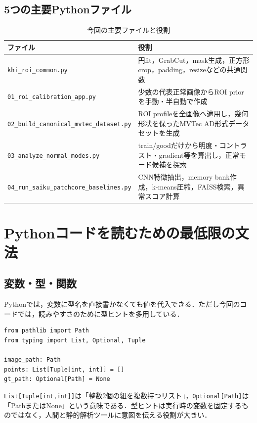 \documentclass[a4paper,11pt]{ltjsreport}
\begin{document}
\section{5つの主要Pythonファイル}
\begin{table}[H]
\centering
\caption{今回の主要ファイルと役割}
\begin{tabularx}{\linewidth}{L{44mm} Y}
\toprule
ファイル & 役割 \\
\midrule
\texttt{khi\_roi\_common.py} & 円fit，GrabCut，mask生成，正方形crop，padding，resizeなどの共通関数 \\
\texttt{01\_roi\_calibration\_app.py} & 少数の代表正常画像からROI priorを手動・半自動で作成 \\
\texttt{02\_build\_canonical\_mvtec\_dataset.py} & ROI profileを全画像へ適用し，幾何形状を保ったMVTec AD形式データセットを生成 \\
\texttt{03\_analyze\_normal\_modes.py} & train/goodだけから明度・コントラスト・gradient等を算出し，正常モード候補を探索 \\
\texttt{04\_run\_saiku\_patchcore\_baselines.py} & CNN特徴抽出，memory bank作成，k-means圧縮，FAISS検索，異常スコア計算 \\
\bottomrule
\end{tabularx}
\end{table}

\chapter{Pythonコードを読むための最低限の文法}

\section{変数・型・関数}
Pythonでは，変数に型名を直接書かなくても値を代入できる．ただし今回のコードでは，読みやすさのために型ヒントを多用している．

\begin{lstlisting}
from pathlib import Path
from typing import List, Optional, Tuple

image_path: Path
points: List[Tuple[int, int]] = []
gt_path: Optional[Path] = None
\end{lstlisting}

\texttt{List[Tuple[int,int]]}は「整数2個の組を複数持つリスト」，\texttt{Optional[Path]}は「PathまたはNone」という意味である．型ヒントは実行時の変数を固定するものではなく，人間と静的解析ツールに意図を伝える役割が大きい．
\end{document}
